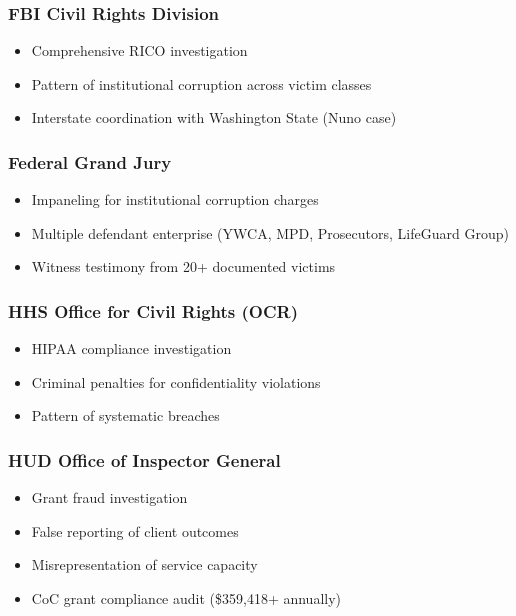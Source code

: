 \documentclass[11pt,letterpaper]{article}
\begin{document}
\subsubsection{FBI Civil Rights Division}
\begin{itemize}[leftmargin=*]
\item Comprehensive RICO investigation
\item Pattern of institutional corruption across victim classes
\item Interstate coordination with Washington State (Nuno case)
\end{itemize}

\subsubsection{Federal Grand Jury}
\begin{itemize}[leftmargin=*]
\item Impaneling for institutional corruption charges
\item Multiple defendant enterprise (YWCA, MPD, Prosecutors, LifeGuard Group)
\item Witness testimony from 20+ documented victims
\end{itemize}

\subsubsection{HHS Office for Civil Rights (OCR)}
\begin{itemize}[leftmargin=*]
\item HIPAA compliance investigation
\item Criminal penalties for confidentiality violations
\item Pattern of systematic breaches
\end{itemize}

\subsubsection{HUD Office of Inspector General}
\begin{itemize}[leftmargin=*]
\item Grant fraud investigation
\item False reporting of client outcomes
\item Misrepresentation of service capacity
\item CoC grant compliance audit (\$359,418+ annually)
\end{itemize}
\end{document}
